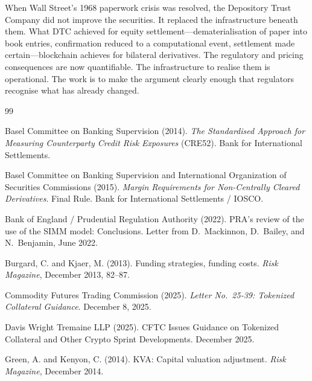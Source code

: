 \documentclass[12pt,letterpaper]{article}
\numberwithin{equation}{section}
\theoremstyle{remark}
\begin{document}
When Wall Street's 1968 paperwork crisis was resolved, the Depository Trust
Company did not improve the securities. It replaced the infrastructure
beneath them. What DTC achieved for equity settlement---dematerialisation
of paper into book entries, confirmation reduced to a computational event,
settlement made certain---blockchain achieves for bilateral derivatives.
The regulatory and pricing consequences are now quantifiable. The
infrastructure to realise them is operational. The work is to make the
argument clearly enough that regulators recognise what has already changed.



\begin{thebibliography}{99}

Basel Committee on Banking Supervision (2014).
\newblock \emph{The Standardised Approach for Measuring Counterparty Credit
  Risk Exposures} (CRE52).
\newblock Bank for International Settlements.

Basel Committee on Banking Supervision and International Organization of
  Securities Commissions (2015).
\newblock \emph{Margin Requirements for Non-Centrally Cleared Derivatives}.
\newblock Final Rule. Bank for International Settlements / IOSCO.

Bank of England / Prudential Regulation Authority (2022).
\newblock PRA's review of the use of the SIMM model: Conclusions.
\newblock Letter from D.~Mackinnon, D.~Bailey, and N.~Benjamin, June 2022.

Burgard, C. and Kjaer, M. (2013).
\newblock Funding strategies, funding costs.
\newblock \emph{Risk Magazine}, December 2013, 82--87.

Commodity Futures Trading Commission (2025).
\newblock \emph{Letter No.\ 25-39: Tokenized Collateral Guidance}.
\newblock December 8, 2025.

Davis Wright Tremaine LLP (2025).
\newblock CFTC Issues Guidance on Tokenized Collateral and Other Crypto
  Sprint Developments.
\newblock December 2025.

Green, A. and Kenyon, C. (2014).
\newblock KVA: Capital valuation adjustment.
\newblock \emph{Risk Magazine}, December 2014.


\end{thebibliography}
\end{document}
